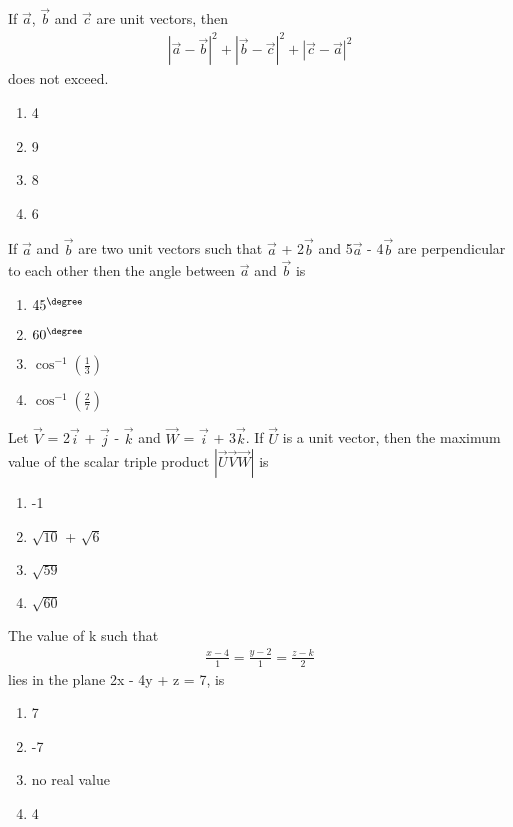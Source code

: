 \item If $\overrightarrow{a}$, $\overrightarrow{b}$ and $\overrightarrow{c}$ are unit vectors, then 
\begin{align*}
|\overrightarrow{a} - \overrightarrow{b}|^{2} + |\overrightarrow{b} - \overrightarrow{c}|^{2} + |\overrightarrow{c} - \overrightarrow{a}|^{2}
\end{align*}
does not exceed.
\begin{enumerate}
\item 4
\item 9
\item 8
\item 6
\end{enumerate}

\item If $\overrightarrow{a}$ and $\overrightarrow{b}$ are two unit vectors such that $\overrightarrow{a}$ + 2$\overrightarrow{b}$ and 5$\overrightarrow{a}$ - 4$\overrightarrow{b}$ are perpendicular to each other then the angle between $\overrightarrow{a}$ and $\overrightarrow{b}$ is
\begin{enumerate}
\item $45^{\degree}$
\item $60^{\degree}$
\item $\cos^{-1}(\frac{1}{3})$
\item $\cos^{-1}(\frac{2}{7})$
\end{enumerate}

\item Let $\overrightarrow{V}$ = 2$\overrightarrow{i}$ + $\overrightarrow{j}$ - $\overrightarrow{k}$ and $\overrightarrow{W}$ = $\overrightarrow{i}$ + 3$\overrightarrow{k}$. If $\overrightarrow{U}$ is a unit vector, then the maximum value of the scalar triple product $|\overrightarrow{U}\overrightarrow{V}\overrightarrow{W}|$
is
\begin{enumerate}
\item -1
\item $\sqrt{10}$ + $\sqrt{6}$
\item $\sqrt{59}$
\item $\sqrt{60}$ 
\end{enumerate}

\item The value of k such that 
\begin{align*}
\frac{x - 4}{1} = \frac{y - 2}{1} = \frac{z - k}{2}
\end{align*}
lies in the plane 2x - 4y + z = 7, is
\begin{enumerate}
\item 7
\item -7
\item no real value
\item 4
\end{enumerate}

